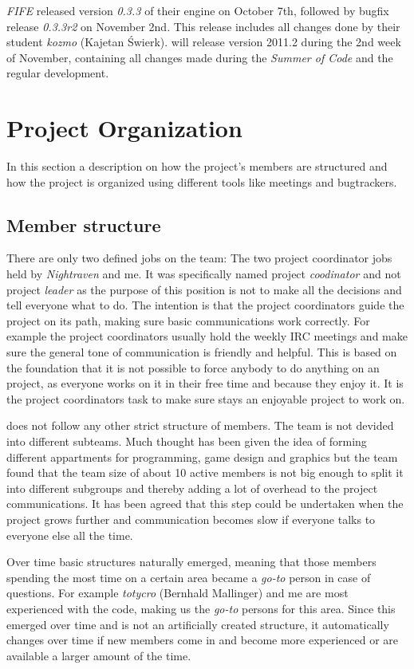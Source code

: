 \textit{FIFE} released version \textit{0.3.3} of their engine on October 7th,
followed by bugfix release \textit{0.3.3r2} on November 2nd. This release includes all changes done by their student
\textit{kozmo} (Kajetan Świerk). \UH{} will release \UH{} version 2011.2 during the 2nd week of November, containing all
changes made during the \textit{Summer of Code} and the regular development.

\section{Project Organization}
In this section a description on how the project's members are structured and how the project is organized using
different tools like meetings and bugtrackers.

\subsection{Member structure}
There are only two defined jobs on the team: The two project coordinator jobs held by \textit{Nightraven} and me. It was
specifically named project \textit{coodinator} and not project \textit{leader} as the purpose of this position is not to
make all the decisions and tell everyone what to do. The intention is that the project coordinators guide the project on
its path, making sure basic communications work correctly. For example the project coordinators usually hold the weekly
IRC meetings and make sure the general tone of communication is friendly and helpful. This is based on the foundation
that it is not possible to force anybody to do anything on an \OS{} project, as everyone works on it in their free time
and because they enjoy it. It is the project coordinators task to make sure stays an enjoyable project to work on.

\UH{} does not follow any other strict structure of members. The team is not devided into different subteams. Much
thought has been given the idea of forming different appartments for programming, game design and graphics but the team
found that the team size of about 10 active members is not big enough to split it into different subgroups and thereby
adding a lot of overhead to the project communications. It has been agreed that this step could be undertaken when the
project grows further and communication becomes slow if everyone talks to everyone else all the time.

Over time basic structures naturally emerged, meaning that those members spending the most time on a certain area became a
\textit{go-to} person in case of questions. For example \textit{totycro} (Bernhald Mallinger) and me are most
experienced with the code, making us the \textit{go-to} persons for this area. Since this emerged over time and is not
an artificially created structure, it automatically changes over time if new members come in and become more experienced
or are available a larger amount of the time.


